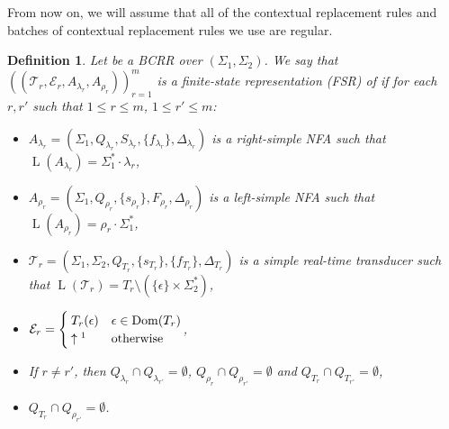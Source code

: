 \documentclass{article}
\newtheorem{definition}{Definition}[section]
\DeclareMathOperator{\Dom}{Dom}
\DeclareMathOperator{\Lang}{L}
\begin{document}
	From now on, we will assume that all of the contextual replacement rules and batches of contextual replacement rules we use are regular.
	\begin{definition} \label{def:FSR}
		Let  be a BCRR over $(\Sigma_1, \Sigma_2)$.
		We say that $((\mathcal{T}_r, \mathcal{E}_r, A_{\lambda_r}, A_{\rho_r}))_{r=1}^m$ is a finite-state representation (FSR) of  if for each $r, r'$ such that $1\le r\le m$, $1\le r'\le m$:
		\begin{itemize}
			\item $A_{\lambda_r} = (\Sigma_1, Q_{\lambda_r}, S_{\lambda_r}, \{f_{\lambda_r}\}, \Delta_{\lambda_r})$ is a right-simple NFA such that $\Lang(A_{\lambda_r}) = \Sigma_1^*\cdot\lambda_r$,
			\item $A_{\rho_r} = (\Sigma_1, Q_{\rho_r}, \{ s_{\rho_r} \}, F_{\rho_r}, \Delta_{\rho_r})$ is a left-simple NFA such that $\Lang(A_{\rho_r}) = \rho_r\cdot\Sigma_1^*$,
			\item $\mathcal{T}_r = (\Sigma_1, \Sigma_2, Q_{T_r}, \{ s_{T_r} \}, \{ f_{T_r} \}, \Delta_{T_r})$ is a simple real-time transducer such that $\Lang(\mathcal{T}_r) = T_r \setminus (\{ \epsilon \} \times \Sigma_2^*)$,
			\item \( \mathcal{E}_r = 
			\begin{cases}
				T_r(\epsilon) & \epsilon\in\Dom(T_r) \\
				\uparrow\footnotemark & \text{otherwise}
			\end{cases}
			\),
			\item If $r\ne r'$, then $Q_{\lambda_r} \cap Q_{\lambda_{r'}} = \emptyset$, $Q_{\rho_r} \cap Q_{\rho_{r'}} = \emptyset$ and $Q_{T_r} \cap Q_{T_{r'}} = \emptyset$,
			\item $Q_{T_r} \cap Q_{\rho_{r'}} = \emptyset$.
		\end{itemize}
	\end{definition}
\end{document}
